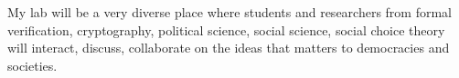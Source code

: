 \documentclass[a4paper]{article}
\begin{document}
My lab will be a very diverse place where students and researchers from formal 
verification, cryptography, 
political science, social science, social choice theory will interact, discuss, 
collaborate on the ideas that matters to democracies and societies.


 

\end{document}
